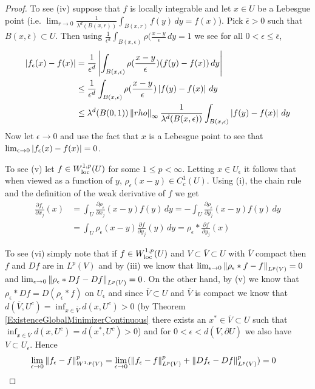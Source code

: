 \begin{proof}
To see (iv) suppose that $f$ is locally integrable and let $x \in U$ be a Lebesgue point (i.e. $\lim_{r \to 0} \frac{1}{\lambda^d(B(x,r))} \int_{B(x,r)} f(y) \, dy = f(x)$).  Pick $\overline{\epsilon}>0$ such that $B(x,\overline{\epsilon}) \subset U$.  Then using 
$\frac{1}{\epsilon^d} \int_{B(x,\epsilon)} \rho(\frac{x-y}{\epsilon} \, dy = 1$ we see for all $0 < \epsilon \leq \overline{\epsilon}$,
\begin{align*}
\left \vert f_\epsilon(x) - f(x) \right \vert &= \frac{1}{\epsilon^d} \left \vert \int_{B(x,\epsilon)} \rho (\frac{x-y}{\epsilon}) (f(y) - f(x)) \, dy \right \vert \\
&\leq \frac{1}{\epsilon^d} \int_{B(x,\epsilon)} \rho (\frac{x-y}{\epsilon}) \left \vert  f(y) - f(x) \right \vert \, dy \\
&\leq \lambda^d(B(0,1)) \left \lVert rho \right \rVert_\infty \frac{1}{\lambda^d(B(x, \epsilon))} \int_{B(x,\epsilon)} \left \vert  f(y) - f(x) \right \vert \, dy
\end{align*}
Now let $\epsilon \to 0$ and use the fact that $x$ is a Lebesgue point to see that $\lim_{\epsilon \to 0} \left \vert f_\epsilon(x) - f(x) \right \vert=0$.

To see (v) let $f \in W^{1,p}_{\operatorname*{loc}}(U)$ for some $1 \leq p < \infty$.  Letting $x \in U_\epsilon$ it follows that when viewed as a function of $y$, $\rho_\epsilon(x-y) \in C^1_c(U)$.  Using (i), the chain rule and the definition of the weak derivative of $f$ we get
\begin{align*}
\frac{\partial f_\epsilon}{\partial x_j}(x) &= \int_U \frac{\partial \rho_\epsilon}{\partial x_j}(x-y) f(y) \, dy 
= -\int_U \frac{\partial \rho_\epsilon}{\partial y_j}(x-y) f(y) \, dy \\
&= \int_U \rho_\epsilon(x-y) \frac{\partial f}{\partial y_j}(y) \, dy 
= \rho_\epsilon \ast \frac{\partial f}{\partial y_j}(x)
\end{align*}

To see (vi) simply note that if $f \in W^{1,p}_{\operatorname*{loc}}(U)$ and $V \subset \overline{V} \subset U$ with $\overline{V}$ compact then $f$ and $Df$ are in $L^p(V)$ and by (iii) we know that $\lim_{\epsilon \to 0} \left \lVert \rho_\epsilon \ast f - f \right \rVert_{L^p(V)} = 0$ and $\lim_{\epsilon \to 0} \left \lVert \rho_\epsilon \ast Df - Df \right \rVert_{L^p(V)} = 0$.  On the other hand, by (v) we know that $\rho_\epsilon \ast Df = D (\rho_\epsilon \ast f)$ on $U_\epsilon$  and since $\overline{V} \subset U$ and $\overline{V}$ is compact we know that $d(\overline{V}, U^c) = \inf_{x \in \overline{V}} d(x, U^c) > 0$ (by Theorem \ref{ExistenceGlobalMinimizerContinuous} there exists an $x^* \in \overline{V} \subset U$ such that $\inf_{x \in \overline{V}} d(x, U^c) = d(x^*, U^c)>0$) and for $0<\epsilon <d(\overline{V}, \partial U)$ we also have $V \subset U_\epsilon$.  Hence
\begin{align*}
\lim_{\epsilon \to 0} \left \lVert f_\epsilon - f \right \rVert^p_{W^{1,p}(V)} &= \lim_{\epsilon \to 0} (\left \lVert f_\epsilon - f \right \rVert^p_{L^{p}(V)} + \left \lVert Df_\epsilon - Df \right \rVert^p_{L^{p}(V)}) = 0
\end{align*}
\end{proof}

